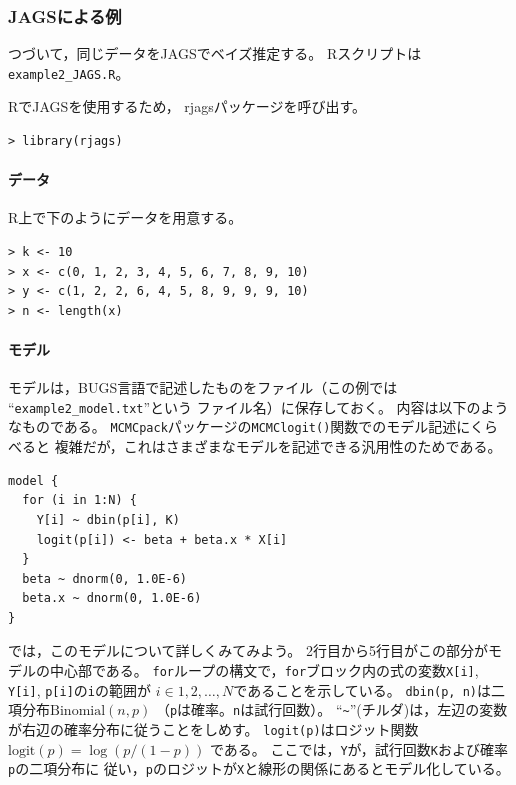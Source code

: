 \documentclass[11pt,uplatex]{jsarticle}
\begin{document}

\subsubsection{JAGSによる例}

つづいて，同じデータを\textsf{JAGS}でベイズ推定する。
\textsf{R}スクリプトは\texttt{example2\_JAGS.R}。


\textsf{R}で\textsf{JAGS}を使用するため，
\textsf{rjags}パッケージを呼び出す。
\begin{lstlisting}
> library(rjags)
\end{lstlisting}

\paragraph{データ}
\textsf{R}上で下のようにデータを用意する。
\begin{lstlisting}
> k <- 10
> x <- c(0, 1, 2, 3, 4, 5, 6, 7, 8, 9, 10)
> y <- c(1, 2, 2, 6, 4, 5, 8, 9, 9, 9, 10)
> n <- length(x)
\end{lstlisting}


\paragraph{モデル}
モデルは，BUGS言語で記述したものをファイル（この例では
``\texttt{example2\_model.txt}''という
ファイル名）に保存しておく。
内容は以下のようなものである。
\texttt{MCMCpack}パッケージの\texttt{MCMClogit()}関数でのモデル記述にくらべると
複雑だが，これはさまざまなモデルを記述できる汎用性のためである。

\begin{lstlisting}
model {
  for (i in 1:N) {
    Y[i] ~ dbin(p[i], K)
    logit(p[i]) <- beta + beta.x * X[i]
  }
  beta ~ dnorm(0, 1.0E-6)
  beta.x ~ dnorm(0, 1.0E-6)
}
\end{lstlisting}

では，このモデルについて詳しくみてみよう。
2行目から5行目がこの部分がモデルの中心部である。
\texttt{for}ループの構文で，\texttt{for}ブロック内の式の変数\texttt{X[i]}, \texttt{Y[i]}, 
\texttt{p[i]}の\texttt{i}の範囲が
$i \in 1, 2, \dots, N$であることを示している。
\texttt{dbin(p, n)}は二項分布$\mathrm{Binomial}(n, p)$
（\texttt{p}は確率。\texttt{n}は試行回数）。
``\texttt{\textasciitilde}''(チルダ)は，左辺の変数が右辺の確率分布に従うことをしめす。
\texttt{logit(p)}はロジット関数
$\mathrm{logit}(p) = \log(p/(1-p))$
である。
ここでは，\texttt{Y}が，試行回数\texttt{K}および確率\texttt{p}の二項分布に
従い，\texttt{p}のロジットが\texttt{X}と線形の関係にあるとモデル化している。
\end{document}
